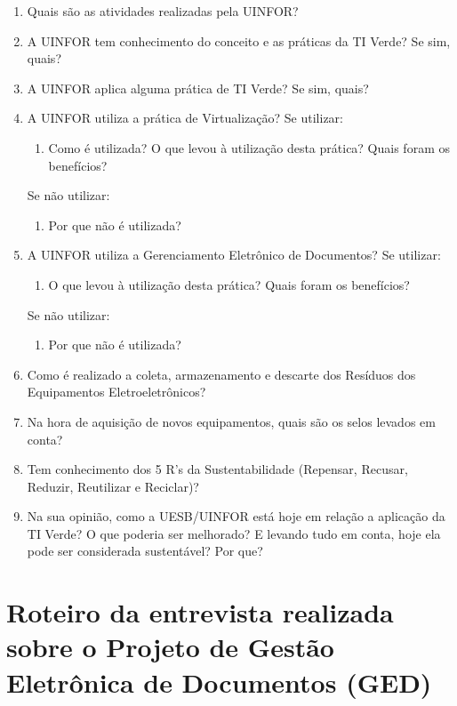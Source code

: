 \begin{apendicesenv}
\begin{enumerate}
    \item Quais são as atividades realizadas pela UINFOR?
    \item A UINFOR tem conhecimento do conceito e as práticas da TI Verde? Se sim, quais?
    \item A UINFOR aplica alguma prática de TI Verde? Se sim, quais?
    \item A UINFOR utiliza a prática de Virtualização?
    \subitem Se utilizar:
    \begin{enumerate}
        \item Como é utilizada? O que levou à utilização desta prática? Quais foram os benefícios?
    \end{enumerate}
    \subitem Se não utilizar:
    \begin{enumerate}
        \item Por que não é utilizada?
    \end{enumerate}
    \item A UINFOR utiliza a Gerenciamento Eletrônico de Documentos?
    \subitem Se utilizar:
    \begin{enumerate}
        \item O que levou à utilização desta prática? Quais foram os benefícios?
    \end{enumerate}
    \subitem Se não utilizar:
    \begin{enumerate}
        \item Por que não é utilizada?
    \end{enumerate}
    \item Como é realizado a coleta, armazenamento e descarte dos Resíduos dos Equipamentos Eletroeletrônicos?
    \item Na hora de aquisição de novos equipamentos, quais são os selos levados em conta?
    \item Tem conhecimento dos 5 R’s da Sustentabilidade (Repensar, Recusar, Reduzir, Reutilizar e Reciclar)?
    \item Na sua opinião, como a UESB/UINFOR está hoje em relação a aplicação da TI Verde? O que poderia ser melhorado? E levando tudo em conta, hoje ela pode ser considerada sustentável? Por que?
\end{enumerate}

\chapter{Roteiro da entrevista realizada sobre o Projeto de Gestão Eletrônica de Documentos (GED)}


\end{apendicesenv}

